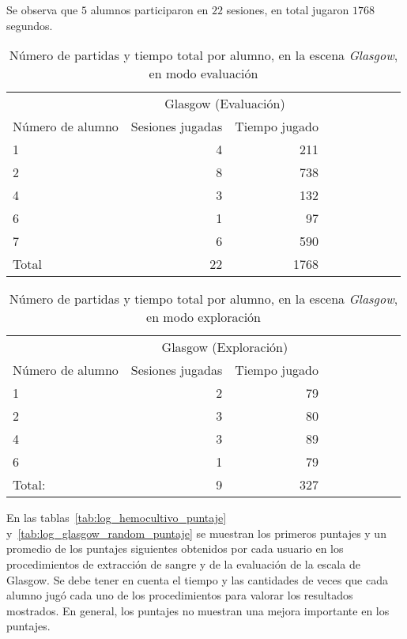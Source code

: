Se observa que $5$ alumnos participaron en $22$ sesiones, en total jugaron
$1768$ segundos.

\begin{table}[!hbt]
\centering
\begin{tabular}{lrrrrrrrr}
\toprule
& \multicolumn{2}{c}{Glasgow (Evaluación)} \\
                   \cmidrule(lr){2-3} 
Número de alumno   & Sesiones jugadas                            & Tiempo jugado \\
\midrule
1     & 4  & 211 \\
2     & 8  & 738 \\
4     & 3  & 132 \\
6     & 1  & 97  \\
7     & 6  & 590 \\
\midrule
Total & 22 & 1768 \\
\bottomrule
\end{tabular}
\caption{Número de partidas y tiempo total por alumno, en la escena
    \textit{Glasgow}, en modo evaluación}
\label{tab:log_glasgow_random_partida}
\end{table}


\begin{table}[!hbt]
\centering
\begin{tabular}{lrrrrrrrr}
\toprule
& \multicolumn{2}{c}{Glasgow (Exploración)} \\
                   \cmidrule(lr){2-3} 
Número de alumno   & Sesiones jugadas                            & Tiempo jugado \\
\midrule
1        & 2 & 79 \\
2        & 3 & 80 \\
4        & 3 & 89 \\
6        & 1 & 79 \\
\midrule
Total:   & 9 & 327 \\
\bottomrule
\end{tabular}
\caption{Número de partidas y tiempo total por alumno, en la escena
    \textit{Glasgow}, en modo exploración}
\label{tab:log_glasgow_custom_partida}
\end{table}


En las tablas~\ref{tab:log_hemocultivo_puntaje}
y~\ref{tab:log_glasgow_random_puntaje} se muestran los primeros puntajes y un
promedio de los puntajes siguientes obtenidos por cada usuario en los
procedimientos de extracción de sangre y de la evaluación de la escala de
Glasgow. Se debe tener en cuenta el tiempo y las cantidades de veces que cada
alumno jugó cada uno de los procedimientos para valorar los resultados
mostrados. En general, los puntajes no muestran una mejora importante en los
puntajes.

